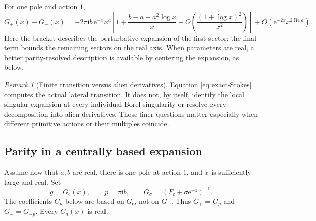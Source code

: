 \documentclass[11pt,a4paper]{article}
\numberwithin{equation}{section}
\theoremstyle{definition}
\theoremstyle{remark}
\newtheorem{remark}[theorem]{Remark}
\newcommand{\e}{\mathrm e}
\newcommand{\ii}{\mathrm i}
\newcommand{\cF}{F_{\mathrm c}}
\newcommand{\cG}{G_{\mathrm c}}
\DeclareMathOperator{\Rea}{Re}
\begin{document}
For one pole and action $1$,
\begin{equation}
 G_+(x)-G_-(x)
 =-2\pi\ii b\,\e^{-x}x^a
 \left[1+\frac{b-a-a^2\log x}{x}
 +O\!\left(\frac{(1+\log x)^2}{x^2}\right)\right]
 +O\!\left(\e^{-2x}x^{2\Rea a}\right).
 \label{eq:leading-jump}
\end{equation}
Here the bracket describes the perturbative expansion of the first sector; the final term bounds the remaining sectors on the real axis. When parameters are real, a better parity-resolved description is available by centering the expansion, as below.

\begin{remark}[Finite transition versus alien derivatives]
Equation \eqref{eq:exact-Stokes} computes the actual lateral transition. It does not, by itself, identify the local singular expansion at every individual Borel singularity or resolve every decomposition into alien derivatives. Those finer questions matter especially when different primitive actions or their multiples coincide.
\end{remark}

\subsection{Parity in a centrally based expansion}
Assume now that $a,b$ are real, there is one pole at action $1$, and $x$ is sufficiently large and real. Set
\[
 g=\cG(x),\qquad p=\pi\ii b,
 \qquad G_\sigma=(\cF+\sigma\e^{-z})^{-1}.
\]
The coefficients $C_n$ below are based on $\cG$, not on $G_-$. Thus
$G_+=G_p$ and $G_-=G_{-p}$. Every $C_n(x)$ is real.
\end{document}
